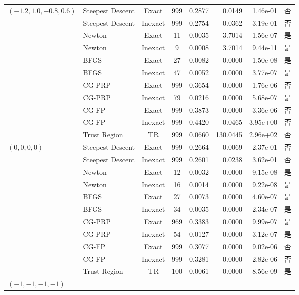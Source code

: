 \documentclass[a4paper,12pt]{article}
\begin{document}
{\begin{longtable}{llccrrrc}
    \multirow{11}{*}{$(-1.2, 1.0, -0.8, 0.6)$} 
    & Steepest Descent & Exact & 999 & 0.2877 & 0.0149 & 1.46e-01 & 否 \\
    & Steepest Descent & Inexact & 999 & 0.2754 & 0.0362 & 3.19e-01 & 否 \\
    & Newton & Exact & 11 & 0.0035 & 3.7014 & 1.56e-07 & 是 \\
    & Newton & Inexact & 9 & 0.0008 & 3.7014 & 9.44e-11 & 是 \\
    & BFGS & Exact & 27 & 0.0082 & 0.0000 & 1.50e-08 & 是 \\
    & BFGS & Inexact & 47 & 0.0052 & 0.0000 & 3.77e-07 & 是 \\
    & CG-PRP & Exact & 999 & 0.3654 & 0.0000 & 1.76e-06 & 否 \\
    & CG-PRP & Inexact & 79 & 0.0216 & 0.0000 & 5.68e-07 & 是 \\
    & CG-FP & Exact & 999 & 0.3873 & 0.0000 & 3.36e-06 & 否 \\
    & CG-FP & Inexact & 999 & 0.4420 & 0.0465 & 3.95e+00 & 否 \\
    & Trust Region & TR & 999 & 0.0660 & 130.0445 & 2.96e+02 & 否 \\
    \midrule
    \multirow{11}{*}{$(0, 0, 0, 0)$} 
    & Steepest Descent & Exact & 999 & 0.2664 & 0.0069 & 2.37e-01 & 否 \\
    & Steepest Descent & Inexact & 999 & 0.2601 & 0.0238 & 3.62e-01 & 否 \\
    & Newton & Exact & 12 & 0.0032 & 0.0000 & 9.15e-08 & 是 \\
    & Newton & Inexact & 16 & 0.0014 & 0.0000 & 9.22e-08 & 是 \\
    & BFGS & Exact & 27 & 0.0073 & 0.0000 & 4.60e-07 & 是 \\
    & BFGS & Inexact & 34 & 0.0035 & 0.0000 & 2.34e-07 & 是 \\
    & CG-PRP & Exact & 969 & 0.3383 & 0.0000 & 9.99e-07 & 是 \\
    & CG-PRP & Inexact & 54 & 0.0127 & 0.0000 & 3.12e-07 & 是 \\
    & CG-FP & Exact & 999 & 0.3077 & 0.0000 & 9.02e-06 & 否 \\
    & CG-FP & Inexact & 999 & 0.3281 & 0.0000 & 2.82e-06 & 否 \\
    & Trust Region & TR & 100 & 0.0061 & 0.0000 & 8.56e-09 & 是 \\
    \midrule
    \multirow{11}{*}{$(-1, -1, -1, -1)$} 

\end{longtable}}
\end{document}
